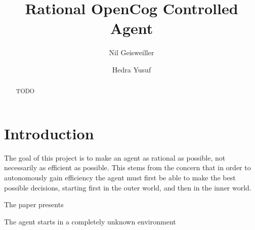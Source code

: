 \documentclass[runningheads]{llncs}
\begin{document}
%
\title{Rational OpenCog Controlled Agent}

%
\author{Nil Geisweiller
  \and Hedra Yusuf}
%
%
%
\maketitle              %
%

\begin{abstract}
  
  TODO

\end{abstract}

\section{Introduction}

The goal of this project is to make an agent as rational as possible,
not necessarily as efficient as possible.  This stems from the concern
that in order to autonomously gain efficiency the agent must first be
able to make the best possible decisions, starting first in the outer
world, and then in the inner world.


The paper presents

The agent starts in a completely unknown environment
\end{document}
